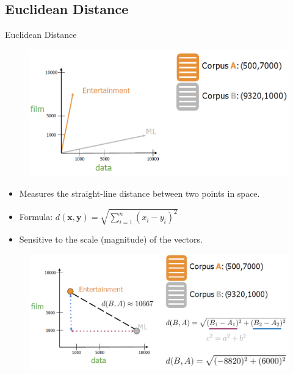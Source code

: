 \subsection{Euclidean Distance}
\begin{frame}[allowframebreaks]{Euclidean Distance}
    \begin{figure}
        \centering
        \includegraphics[width=\textwidth,height=0.65\textheight,keepaspectratio]{images/vector-space/euclidean-distance-1.png}
    \end{figure}
    \begin{itemize}
        \item Measures the straight-line distance between two points in space.
        \item Formula: $d(\mathbf{x}, \mathbf{y}) = \sqrt{\sum_{i=1}^{n} (x_i - y_i)^2}$
        \item Sensitive to the scale (magnitude) of the vectors.
    \end{itemize}
\framebreak
    \begin{figure}
        \centering
        \includegraphics[width=\textwidth,height=0.65\textheight,keepaspectratio]{images/vector-space/euclidean-distance-2.png}
    \end{figure}
\end{frame}

